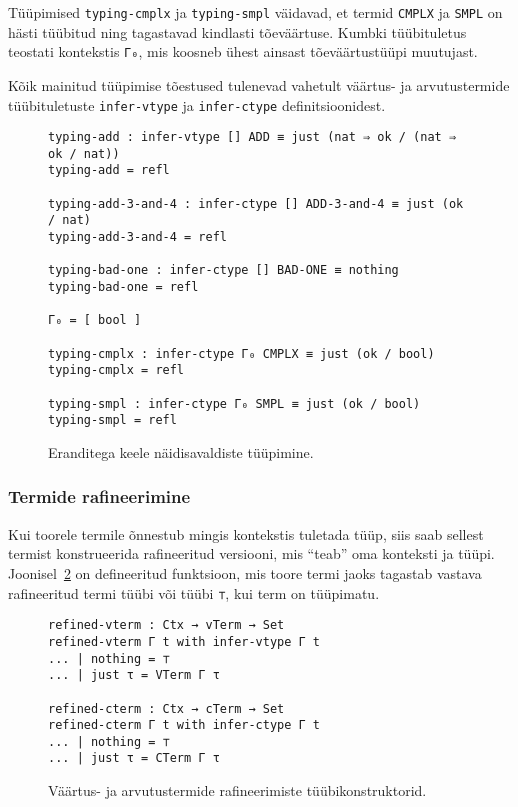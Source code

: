 \documentclass[a4paper,12pt]{article}
\begin{document}
Tüüpimised {\tt typing-cmplx} ja {\tt typing-smpl} väidavad, et termid {\tt CMPLX} ja {\tt SMPL} on hästi tüübitud ning tagastavad kindlasti tõeväärtuse. Kumbki tüübituletus teostati kontekstis {\tt Γ₀}, mis koosneb ühest ainsast tõeväärtustüüpi muutujast.

Kõik mainitud tüüpimise tõestused tulenevad vahetult väärtus- ja arvutustermide tüübituletuste {\tt infer-vtype} ja {\tt infer-ctype} definitsioonidest.

\begin{figure}
  \begin{BVerbatim}
typing-add : infer-vtype [] ADD ≡ just (nat ⇒ ok / (nat ⇒ ok / nat))
typing-add = refl

typing-add-3-and-4 : infer-ctype [] ADD-3-and-4 ≡ just (ok / nat)
typing-add-3-and-4 = refl

typing-bad-one : infer-ctype [] BAD-ONE ≡ nothing
typing-bad-one = refl

Γ₀ = [ bool ]

typing-cmplx : infer-ctype Γ₀ CMPLX ≡ just (ok / bool)
typing-cmplx = refl

typing-smpl : infer-ctype Γ₀ SMPL ≡ just (ok / bool)
typing-smpl = refl
  \end{BVerbatim}
  \caption{Eranditega keele näidisavaldiste tüüpimine.}
  \label{fig:exc.typing}
\end{figure}

\subsubsection{Termide rafineerimine}

Kui toorele termile õnnestub mingis kontekstis tuletada tüüp, siis saab sellest termist konstrueerida rafineeritud versiooni, mis ``teab'' oma konteksti ja tüüpi.
Joonisel~\ref{fig:exc.infer-term-type} on defineeritud funktsioon, mis toore termi jaoks tagastab vastava rafineeritud termi tüübi või tüübi {\tt ⊤}, kui term on tüüpimatu.
\begin{figure}
  \begin{BVerbatim}
refined-vterm : Ctx → vTerm → Set
refined-vterm Γ t with infer-vtype Γ t 
... | nothing = ⊤
... | just τ = VTerm Γ τ

refined-cterm : Ctx → cTerm → Set
refined-cterm Γ t with infer-ctype Γ t 
... | nothing = ⊤
... | just τ = CTerm Γ τ
  \end{BVerbatim}
  \caption{Väärtus- ja arvutustermide rafineerimiste tüübikonstruktorid.}
  \label{fig:exc.infer-term-type}
\end{figure}
\end{document}
